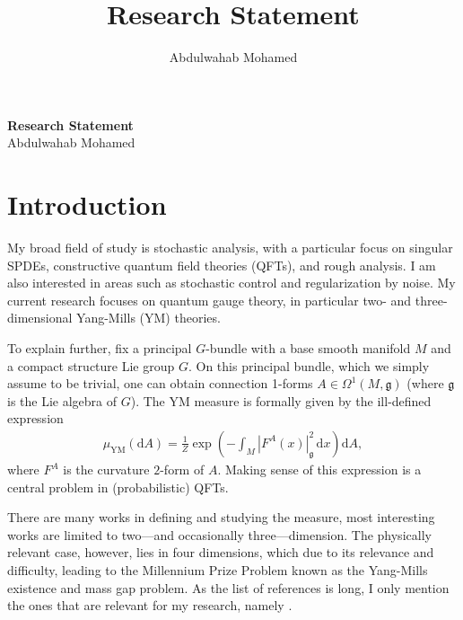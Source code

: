 \documentclass[11pt]{article}
\title{Research Statement}
\author{Abdulwahab Mohamed}
\numberwithin{equation}{section}
\theoremstyle{definition}
\theoremstyle{remark}
\newcommand{\diff}{\mathrm{d}}
\newcommand{\1}{\mathbf 1}
\newcommand{\<}{\langle}
\renewcommand{\>}{\rangle}
\begin{document}
\vspace{-10pt}
\begin{center}
    {\Large \textbf{Research Statement}} \\ \vspace{1pt}
    Abdulwahab Mohamed
\end{center}

\section{Introduction}
My broad field of study is stochastic analysis, with a particular focus on singular SPDEs, constructive quantum field theories (QFTs), and rough analysis. I am also interested in areas such as stochastic control and regularization by noise.
%
My current research focuses on quantum gauge theory, in particular two- and three-dimensional Yang-Mills (YM) theories.
%
%

To explain further, fix a principal $G$-bundle with a base smooth manifold $M$ and a compact structure Lie group $G$. On this principal bundle, which we simply assume to be trivial, one can obtain connection 1-forms $A\in \Omega^1(M,\mathfrak g)$ (where  $\mathfrak g$ is the Lie algebra of $G$).  The YM measure is formally given by the ill-defined expression
\begin{align}\label{eq:YM_measure}
\mu_{\mathrm{YM}}(\diff A)=\frac 1 Z\exp\left(-\int_{M}|F^A(x)|_{\mathfrak g}^2\,\diff x\right)\diff A,
\end{align}
where $F^A$ is the curvature $2$-form of $A$. Making sense of this expression is a central problem in (probabilistic) QFTs. 

There are many works in defining and studying the measure, most interesting works are limited to two—and occasionally three—dimension. The physically relevant case, however, lies in four dimensions, which due to its relevance and difficulty, leading to the Millennium Prize Problem known as the Yang-Mills existence and mass gap problem. As the list of references is long, I only mention the ones that are relevant for my research, namely \cite{Driver89}.  
\end{document}
